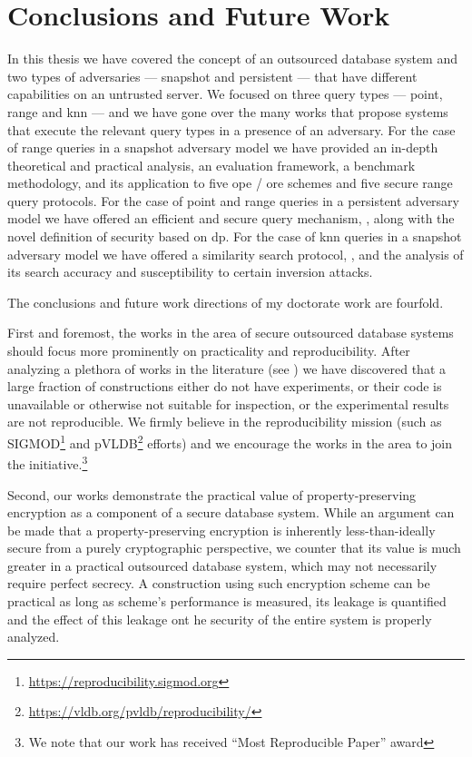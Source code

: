 \chapter{Conclusions and Future Work}
\thispagestyle{myheadings}

	In this thesis we have covered the concept of an outsourced database system and two types of adversaries --- snapshot and persistent --- that have different capabilities on an untrusted server.
	We focused on three query types --- point, range and \acrlong{knn} --- and we have gone over the many works that propose systems that execute the relevant query types in a presence of an adversary.
	For the case of range queries in a snapshot adversary model we have provided an in-depth theoretical and practical analysis, an evaluation framework, a benchmark methodology, and its application to five \acrshort{ope} / \acrshort{ore} schemes and five secure range query protocols.
	For the case of point and range queries in a persistent adversary model we have offered an efficient and secure query mechanism, \epsolute{}, along with the novel definition of security based on \acrlong{dp}.
	For the case of \acrlong{knn} queries in a snapshot adversary model we have offered a similarity search protocol, \kanon{}, and the analysis of its search accuracy and susceptibility to certain inversion attacks.

	The conclusions and future work directions of my doctorate work are fourfold.

	First and foremost, the works in the area of secure outsourced database systems should focus more prominently on practicality and reproducibility.
	After analyzing a plethora of works in the literature (see \cite{ore-benchmark-17,epsolute}) we have discovered that a large fraction of constructions either do not have experiments, or their code is unavailable or otherwise not suitable for inspection, or the experimental results are not reproducible.
	We firmly believe in the reproducibility mission (such as SIGMOD\footnote{\url{https://reproducibility.sigmod.org}} and pVLDB\footnote{\url{https://vldb.org/pvldb/reproducibility/}} efforts) and we encourage the works in the area to join the initiative.\footnote{We note that our work \cite{ore-benchmark-17} has received ``Most Reproducible Paper'' award}

	Second, our works \cite{ore-benchmark-17,k-anon} demonstrate the practical value of property-preserving encryption as a component of a secure database system.
	While an argument can be made that a property-preserving encryption is inherently less-than-ideally secure from a purely cryptographic perspective, we counter that its value is much greater in a practical outsourced database system, which may not necessarily require perfect secrecy.
	A construction using such encryption scheme can be practical as long as scheme's performance is measured, its leakage is quantified and the effect of this leakage ont he security of the entire system is properly analyzed.

